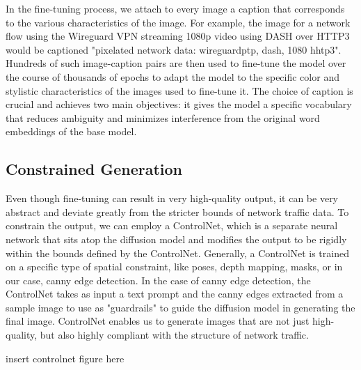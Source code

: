 \documentclass[acmsmall, nonacm]{acmart}
\begin{document}
In the fine-tuning process, we attach to every image a caption that corresponds
to the various characteristics of the image. For example, the image for
a network flow using the Wireguard VPN streaming 1080p video using DASH over
HTTP3 would be captioned "pixelated network data: wireguardptp, dash, 1080 hhtp3".
Hundreds of such image-caption pairs are then used to fine-tune the model over
the course of thousands of epochs to adapt the model to the specific 
color and stylistic characteristics of the images used to fine-tune it. 
The choice of caption is crucial and achieves two main objectives:
it gives the model a specific vocabulary that reduces ambiguity and minimizes
interference from the original word embeddings of the base model.

\subsection{Constrained Generation}
Even though fine-tuning can result in very high-quality output, it can
be very abstract and deviate greatly from the stricter bounds of network 
traffic data. To constrain the output, we can employ a ControlNet, which
is a separate neural network that sits atop the diffusion model and
modifies the output to be rigidly within the bounds defined by the 
ControlNet. Generally, a ControlNet is trained on a specific type of
spatial constraint, like poses, depth mapping, masks, or in our case,
canny edge detection. In the case of canny edge detection, the ControlNet 
takes as input a text prompt and the canny edges extracted from a sample image
to use as "guardrails" to guide the diffusion model in generating the final image.
ControlNet enables us to generate images that are not just high-quality,
but also highly compliant with the structure of network traffic.

insert controlnet figure here
\end{document}
